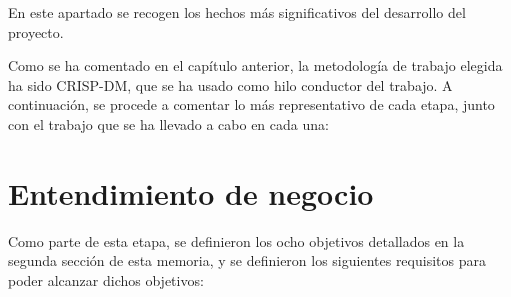 
En este apartado se recogen los hechos más significativos del desarrollo del proyecto.

Como se ha comentado en el capítulo anterior, la metodología de trabajo elegida ha sido CRISP-DM, que se ha usado como hilo conductor del trabajo. A continuación, se procede a comentar lo más representativo de cada etapa, junto con el trabajo que se ha llevado a cabo en cada una:

\section{Entendimiento de negocio}

Como parte de esta etapa, se definieron los ocho objetivos detallados en la segunda sección de esta memoria, y se definieron los siguientes requisitos para poder alcanzar dichos objetivos:

